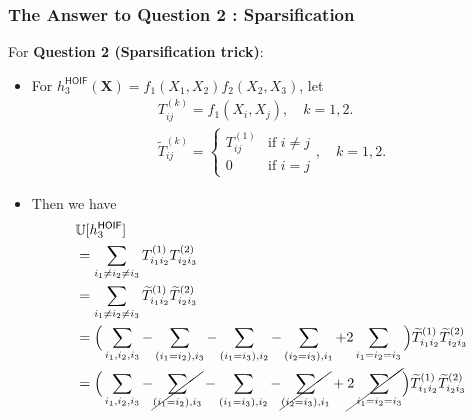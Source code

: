 \documentclass[9pt]{beamer}
\def\tilde{\widetilde}
\theoremstyle{mystyle}
\theoremstyle{mystyletwo}
\def\tilde{\widetilde}
\begin{document}
\begin{frame}
    \frametitle{The Answer to Question 2 : Sparsification}
    For {\bf Question 2 (Sparsification trick)}:
    \begin{itemize}
           \item For $h^{\mathsf{HOIF}}_3(\bm{X}) = f_1(X_1,X_2) f_2(X_2,X_3) $, let 
            \begin{align*}
            T^{(k)}_{ij} = f_1(X_i,X_j), \quad k = 1,2. \\
            \tilde{T}^{(k)}_{ij} = 
            \begin{cases} 
            T^{(1)}_{ij} & \text{if } i \neq j \\
            0 & \text{if } i = j 
            \end{cases}, \quad k = 1,2.
            \end{align*}
            \item Then we have 
        \begin{align*}
            & \mathbb{U}[h^{\mathsf{HOIF}}_3] \\
            & = \sum_{i_1 \neq i_2 \neq i_3} T^{(1)}_{i_1i_2}  T^{(2)}_{i_2i_3} \\
            & = \sum_{i_1 \neq i_2 \neq i_3} \tilde{T}^{(1)}_{i_1i_2}  \tilde{T}^{(2)}_{i_2i_3} \\
     & = \Big(\sum_{i_1,i_2,i_3} - \sum_{(i_1=i_2), i_3 } - \sum_{(i_1=i_3), i_2 } - \sum_{(i_2=i_3), i_1 } + 2 \sum_{i_1=i_2=i_3}\Big) \tilde{T}^{(1)}_{i_1i_2}  \tilde{T}^{(2)}_{i_2i_3} \\
    & = \Big(\sum_{i_1,i_2,i_3} -\cancel{ \sum_{(i_1=i_2), i_3 }} - \sum_{(i_1=i_3), i_2 } - \cancel{\sum_{(i_2=i_3), i_1 }} +  \cancel{2 \sum_{i_1=i_2=i_3}} \Big) \tilde{T}^{(1)}_{i_1i_2}  \tilde{T}^{(2)}_{i_2i_3} \\
        \end{align*}
    \end{itemize}
\end{frame}
\end{document}
